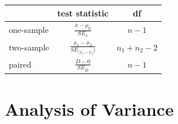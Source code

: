 \documentclass[]{book}
\theoremstyle{definition}
\theoremstyle{definition}
\theoremstyle{definition}
\theoremstyle{remark}
\begin{document}
\begin{longtable}[]{@{}lcc@{}}
\toprule
\begin{minipage}[b]{0.29\columnwidth}\raggedright
\strut
\end{minipage} & \begin{minipage}[b]{0.47\columnwidth}\centering
test statistic\strut
\end{minipage} & \begin{minipage}[b]{0.15\columnwidth}\centering
df\strut
\end{minipage}\tabularnewline
\midrule
\endhead
\begin{minipage}[t]{0.29\columnwidth}\raggedright
one-sample\strut
\end{minipage} & \begin{minipage}[t]{0.47\columnwidth}\centering
\(\frac{\overline{x}-\mu_0}{SE_{\overline{x}}}\)\strut
\end{minipage} & \begin{minipage}[t]{0.15\columnwidth}\centering
\(n-1\)\strut
\end{minipage}\tabularnewline
\begin{minipage}[t]{0.29\columnwidth}\raggedright
two-sample\strut
\end{minipage} & \begin{minipage}[t]{0.47\columnwidth}\centering
\(\frac{\overline{x}_1-\overline{x}_2}{SE_{(\overline{x}_1-\overline{x}_2})}\)\strut
\end{minipage} & \begin{minipage}[t]{0.15\columnwidth}\centering
\(n_1 + n_2 - 2\)\strut
\end{minipage}\tabularnewline
\begin{minipage}[t]{0.29\columnwidth}\raggedright
paired\strut
\end{minipage} & \begin{minipage}[t]{0.47\columnwidth}\centering
\(\frac{\overline{D}-0}{SE_{\overline{D}}}\)\strut
\end{minipage} & \begin{minipage}[t]{0.15\columnwidth}\centering
\(n-1\)\strut
\end{minipage}\tabularnewline
\bottomrule
\end{longtable}

\hypertarget{analysis-of-variance}{%
\chapter{Analysis of Variance}\label{analysis-of-variance}}
\end{document}

